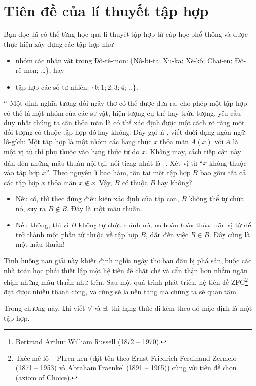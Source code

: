 \chapter{Tiên đề của lí thuyết tập hợp}

Bạn đọc đã có thể từng học qua lí thuyết tập hợp từ cấp học phổ thông và được thực hiện xây dựng các tập hợp như
\begin{itemize}
   \item nhóm các nhân vật trong Đô-rê-mon: \{Nô-bi-ta; Xu-ka; Xê-kô; Chai-en; Đô-rê-mon; \dots\}, hay
   \item tập hợp các số tự nhiên: $\{0; 1; 2; 3; 4; \dots\}$.
\end{itemize}`'
Một định nghĩa tương đối ngây thơ có thể được đưa ra, cho phép một tập hợp có thể là một nhóm của các sự vật, hiện tượng cụ thể hay trừu tượng, yêu cầu duy nhất chúng ta cần thỏa mãn là có thể xác định được một cách rõ ràng một đối tượng có thuộc tập hợp đó hay không. Đây gọi là , viết dưới dạng ngôn ngữ lô-gích: Một tập hợp là một nhóm các hạng thức $x$ thỏa mãn $A(x)$ với $A$ là một vị từ chỉ phụ thuộc vào hạng thức tự do $x$. Không may, cách tiếp cận này dẫn đến những mâu thuẫn nội tại, nổi tiếng nhất là \footnote{Bertrand Arthur William Russell (1872 -- 1970).}. Xét vị từ ``$x$ không thuộc vào tập hợp $x$''. Theo nguyên lí bao hàm, tồn tại một tập hợp $B$ bao gồm tất cả các tập hợp $x$ thỏa mãn $x \notin x$. Vậy, $B$ có thuộc $B$ hay không?
\begin{itemize}
   \item Nếu có, thì theo đúng điều kiện xác định của tập con, $B$ không thể tự chứa nó, suy ra $B \notin B$. Đây là một mâu thuẫn.
   \item Nếu không, thì vì $B$ không tự chứa chính nó, nó hoàn toàn thỏa mãn vị từ để trở thành một phần tử thuộc về tập hợp $B$, dẫn đến việc $B \in B$. Đây cũng là một mâu thuẫn!
\end{itemize}
Tình huống nan giải này khiến định nghĩa ngây thơ ban đầu bị phá sản, buộc các nhà toán học phải thiết lập một hệ tiên đề chặt chẽ và cẩn thận hơn nhằm ngăn chặn những mâu thuẫn như trên. Sau một quá trình phát triển, hệ tiên đề ZFC\footnote{Txéc-mê-lô -- Phren-ken (đặt tên theo Ernst Friedrich Ferdinand Zermelo (1871 -- 1953) và Abraham Fraenkel (1891 -- 1965)) cùng với tiên đề chọn (axiom of Choice).} đạt được nhiều thành công, và cũng sẽ là nền tảng mà chúng ta sẽ quan tâm.

Trong chương này, khi viết $\forall$ và $\exists$, thì hạng thức đi kèm theo đó mặc định là một tập hợp.


